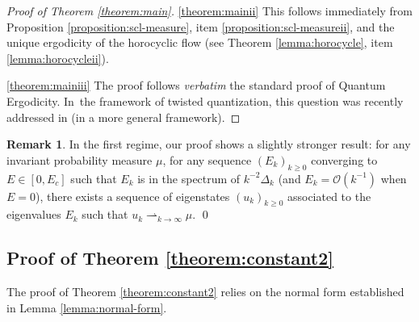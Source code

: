 \documentclass[JEP,XML,SOM,Unicode,published]{cedram}
\theoremstyle{plain}
\theoremstyle{definition}
\newtheorem{remark}[theorem]{Remark}
\newcommand{\bigo}{\mathcal{O}}
\begin{document}
\begin{proof}[Proof of Theorem \ref{theorem:main}]
\smallskip

\eqref{theorem:mainii}
This follows immediately from Proposition \ref{proposition:scl-measure}, item \eqref{proposition:scl-measureii}, and the unique ergodicity of the horocyclic flow (see Theorem \ref{lemma:horocycle}, item \eqref{lemma:horocycleii}).

\smallskip

\eqref{theorem:mainiii}
The proof follows \emph{verbatim} the standard proof of Quantum Ergodicity. In~the framework of twisted quantization, this question was recently addressed in \cite[\S 5.3]{Cekic-Lefeuvre-24} (in a more general framework).
\end{proof}

\begin{remark} In the first regime, our proof shows a slightly
stronger result: for any invariant probability measure $\mu$, for any sequence
$(E_k)_{k \geq 0 }$ converging to $E \in [0, E_c]$ such that $E_k$ is in the spectrum of
$k^{-2} \Delta_k$ (and $E_k= \bigo (k^{-1})$ when $E=0$), there exists a
sequence of eigenstates $(u_k)_{k \geq 0}$ associated to the eigenvalues $E_k$ such that $u_{k}
\rightharpoonup_{k \to \infty} \mu$.
\qed \end{remark}

\subsection{Proof of Theorem \ref{theorem:constant2}} \label{ssection:proof2}The proof of Theorem \ref{theorem:constant2} relies on the normal form established in Lemma \ref{lemma:normal-form}.
\end{document}
